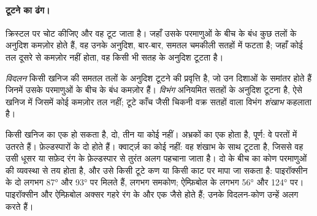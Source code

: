 \paragraph{टूटने का ढंग।} क्रिस्टल पर चोट कीजिए और वह टूट जाता है। जहाँ
उसके परमाणुओं के बीच के बंध कुछ तलों के अनुदिश कमज़ोर होते हैं, वह उनके अनुदिश,
बार-बार, समतल चमकीली सतहों में फटता है; जहाँ कोई तल दूसरे से
कमज़ोर नहीं होता, वह किसी भी सतह के अनुदिश टूटता है।

\begin{definition}[विदलन; विभंग]\label{def:g11:minerals:cleavage}
\emph{विदलन} किसी खनिज की समतल तलों के अनुदिश टूटने की
प्रवृत्ति है, जो उन दिशाओं के समांतर होते हैं जिनमें उसके परमाणुओं के बीच के बंध
कमज़ोर हैं। \emph{विभंग}
अनियमित सतहों के अनुदिश टूटना है, ऐसे खनिज में जिसमें कोई कमज़ोर तल
नहीं; टूटे काँच जैसी चिकनी वक्र सतहों वाला विभंग
\emph{शंखाभ} कहलाता है।
\end{definition}

किसी खनिज का एक  हो सकता है, दो, तीन या कोई नहीं। अभ्रकों का एक होता है, पूर्ण:
वे परतों में उतरते हैं। फ़ेल्डस्पारों के दो होते हैं। क्वार्ट्ज़ का कोई नहीं: वह
शंखाभ  के साथ टूटता है, जिससे वह उसी धूसर या सफ़ेद रंग के फ़ेल्डस्पार से
तुरंत अलग पहचाना जाता है। दो  के बीच का कोण परमाणुओं की व्यवस्था से
तय होता है, और उसे किसी टूटे कण या किसी काट पर मापा जा सकता है: पाइरॉक्सीन के दो
 लगभग \ang{87} और \ang{93} पर मिलते हैं, लगभग समकोण;
ऐम्फ़िबोल के लगभग \ang{56} और \ang{124} पर। पाइरॉक्सीन और
ऐम्फ़िबोल अक्सर गहरे रंग के और एक जैसे होते हैं; उनके विदलन-कोण उन्हें अलग करते हैं।

